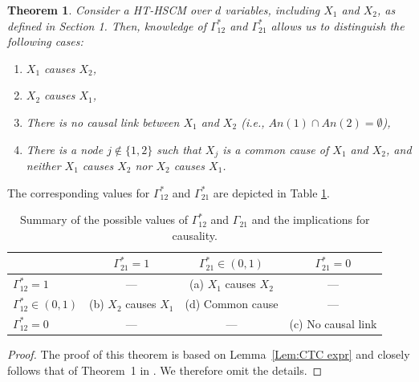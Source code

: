 \documentclass[10pt]{article}
\newtheorem{theorem}{Theorem}
\begin{document}
\begin{theorem}\label{Thm:CTC}
    Consider a HT-HSCM over $d$ variables, including $X_1$ and $X_2$, as defined in Section 1. Then, knowledge of $\Gamma^*_{12}$ and $\Gamma^*_{21}$ allows us to distinguish the following cases:
    \begin{enumerate}
        \item[(a)] $X_1$ causes $X_2$,
        \item[(b)] $X_2$ causes $X_1$,
        \item[(c)] There is no causal link between $X_1$ and $X_2$ (i.e., $An(1) \cap An(2) = \emptyset$),
        \item[(d)] There is a node $j \notin \{1, 2\}$ such that $X_j$ is a common cause of $X_1$ and $X_2$, and neither $X_1$ causes $X_2$ nor $X_2$ causes $X_1$.
    \end{enumerate}
\end{theorem}
The corresponding values for $\Gamma_{12}^*$ and $\Gamma_{21}^*$ are depicted in Table \ref{tab:causal_cases}.

\begin{table}[htpb]
    \centering
    \renewcommand{\arraystretch}{1.5}
    \caption{Summary of the possible values of $\Gamma^*_{12}$ and $\Gamma_{21}$ and the implications for causality.}
    \label{tab:causal_cases}
    \begin{tabular}{lccc}
        \hline
        & $\Gamma^*_{21} = 1$ & $\Gamma^*_{21} \in (0, 1)$ & $\Gamma^*_{21} = 0$ \\
        \hline
        $\Gamma^*_{12} = 1$          & --- & (a) $X_1$ causes $X_2$ & --- \\
        $\Gamma^*_{12} \in (0, 1)$ & (b) $X_2$ causes $X_1$ & (d) Common cause       & --- \\
        $\Gamma^*_{12} = 0$        & --- & --- & (c) No causal link \\
        \hline
    \end{tabular}
\end{table}

\begin{proof}
The proof of this theorem is based on Lemma~\ref{Lem:CTC expr} and closely follows that of Theorem~1 in \cite{gnecco2021causal}. We therefore omit the details.
\end{proof}
\end{document}
